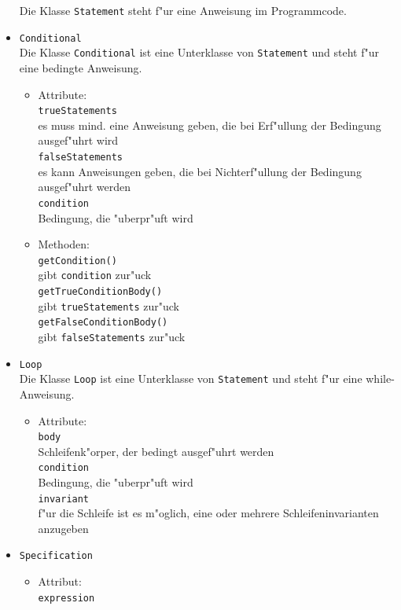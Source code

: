 \documentclass[10pt,a4paper,titlepage]{article}
\begin{document}
\begin{itemize}
Die Klasse \texttt{Statement} steht f"ur eine Anweisung im Programmcode. 
\item \texttt{Conditional} \\
Die Klasse \texttt{Conditional} ist eine Unterklasse von \texttt{Statement} und steht f"ur eine bedingte Anweisung. 
\begin{itemize}
\item Attribute: \\
\texttt{trueStatements} \\
es muss mind. eine Anweisung geben, die bei Erf"ullung der Bedingung ausgef"uhrt wird \\
\texttt{falseStatements} \\
es kann Anweisungen geben, die bei Nichterf"ullung der Bedingung ausgef"uhrt werden \\
\texttt{condition} \\
Bedingung, die "uberpr"uft wird
\item Methoden: \\
\texttt{getCondition()} \\
gibt \texttt{condition} zur"uck \\
\texttt{getTrueConditionBody()} \\
gibt \texttt{trueStatements} zur"uck \\
\texttt{getFalseConditionBody()} \\
gibt \texttt{falseStatements} zur"uck
\end{itemize}
\item \texttt{Loop} \\
Die Klasse \texttt{Loop} ist eine Unterklasse von \texttt{Statement} und steht f"ur eine while-Anweisung. 
\begin{itemize}
\item Attribute: \\
\texttt{body} \\
Schleifenk"orper, der bedingt ausgef"uhrt werden \\
\texttt{condition} \\
Bedingung, die "uberpr"uft wird \\
\texttt{invariant} \\
f"ur die Schleife ist es m"oglich, eine oder mehrere Schleifeninvarianten anzugeben 
\end{itemize}
\item \texttt{Specification}
\begin{itemize}
\item Attribut: \\
\texttt{expression} \\

\end{itemize}
\end{itemize}
\end{document}
